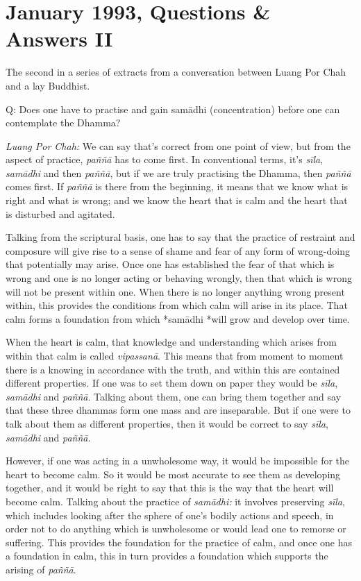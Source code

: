 \chapter{January 1993, Questions \& Answers II}

The second in a series of extracts from a conversation between Luang Por
Chah and a lay Buddhist. 

Q: Does one have to practise and gain samādhi (concentration) before one
can contemplate the Dhamma? 

\emph{Luang Por Chah:} We can say that's correct from one point of view, 
but from the aspect of practice, \emph{paññā} has to come first. In
conventional terms, it's \emph{sīla}, \emph{samādhi} and then
\emph{paññā}, but if we are truly practising the Dhamma, then
\emph{paññā} comes first. If \emph{paññā} is there from the beginning, 
it means that we know what is right and what is wrong; and we know the
heart that is calm and the heart that is disturbed and agitated. 

Talking from the scriptural basis, one has to say that the practice of
restraint and composure will give rise to a sense of shame and fear of
any form of wrong-doing that potentially may arise. Once one has
established the fear of that which is wrong and one is no longer acting
or behaving wrongly, then that which is wrong will not be present within
one. When there is no longer anything wrong present within, this
provides the conditions from which calm will arise in its place. That
calm forms a foundation from which *samādhi *will grow and develop over
time. 

When the heart is calm, that knowledge and understanding which arises
from within that calm is called \emph{vipassanā}. This means that from
moment to moment there is a knowing in accordance with the truth, and
within this are contained different properties. If one was to set them
down on paper they would be \emph{sīla}, \emph{samādhi} and
\emph{paññā}. Talking about them, one can bring them together and say
that these three dhammas form one mass and are inseparable. But if one
were to talk about them as different properties, then it would be
correct to say \emph{sīla}, \emph{samādhi} and \emph{paññā}. 

However, if one was acting in a unwholesome way, it would be impossible
for the heart to become calm. So it would be most accurate to see them
as developing together, and it would be right to say that this is the
way that the heart will become calm. Talking about the practice of
\emph{samādhi:} it involves preserving \emph{sīla}, which includes
looking after the sphere of one's bodily actions and speech, in order
not to do anything which is unwholesome or would lead one to remorse or
suffering. This provides the foundation for the practice of calm, and
once one has a foundation in calm, this in turn provides a foundation
which supports the arising of \emph{paññā}. 

